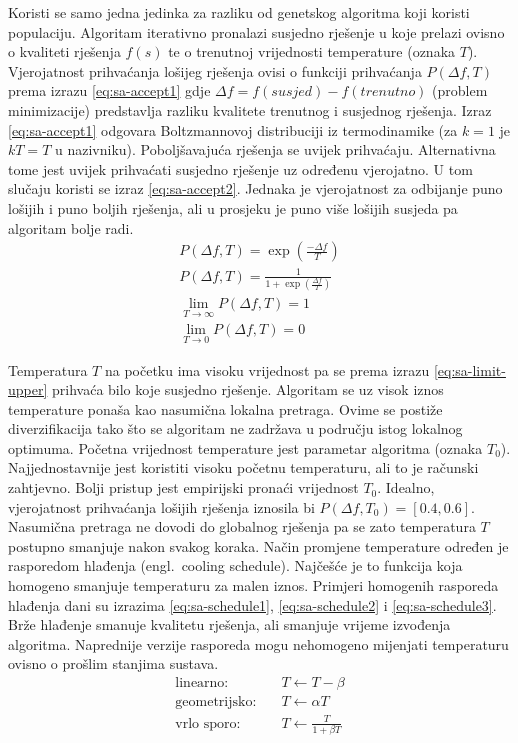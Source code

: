 \documentclass[times, utf8, diplomski]{fer}
\begin{document}
Koristi se samo jedna jedinka za razliku od genetskog algoritma koji koristi populaciju. Algoritam iterativno pronalazi susjedno rješenje u koje prelazi ovisno o kvaliteti rješenja $f(s)$ te o trenutnoj vrijednosti temperature (oznaka $T$). Vjerojatnost prihvaćanja lošijeg rješenja ovisi o funkciji prihvaćanja $P(\Delta f, T)$ prema izrazu \ref{eq:sa-accept1} gdje $\Delta f=f(susjed)-f(trenutno)$ (problem minimizacije) predstavlja razliku kvalitete trenutnog i susjednog rješenja. Izraz \ref{eq:sa-accept1} odgovara Boltzmannovoj distribuciji iz termodinamike (za $k=1$ je $kT=T$ u nazivniku). Poboljšavajuća rješenja se uvijek prihvaćaju. Alternativna tome jest uvijek prihvaćati susjedno rješenje uz određenu vjerojatno. U tom slučaju koristi se izraz \ref{eq:sa-accept2}. Jednaka je vjerojatnost za odbijanje puno lošijih i puno boljih rješenja, ali u prosjeku je puno više lošijih susjeda pa algoritam bolje radi.
%
\begin{gather}
	\label{eq:sa-accept1}
	P(\Delta f, T)=\exp(\frac{- \Delta f}{T}) \\
	\label{eq:sa-accept2}
	P(\Delta f, T)=\frac{1}{1 + \exp(\frac{\Delta f}{T})} \\
	\label{eq:sa-limit-upper}
	\lim_{T \to \infty} P(\Delta f, T)=1 \\
	\label{eq:sa-limit-lower}
	\lim_{T \to 0} P(\Delta f, T)=0
\end{gather}

Temperatura $T$ na početku ima visoku vrijednost pa se prema izrazu \ref{eq:sa-limit-upper} prihvaća bilo koje susjedno rješenje. Algoritam se uz visok iznos temperature ponaša kao nasumična lokalna pretraga. Ovime se postiže diverzifikacija tako što se algoritam ne zadržava u području istog lokalnog optimuma. Početna vrijednost temperature jest parametar algoritma (oznaka $T_{0}$). Najjednostavnije jest koristiti visoku početnu temperaturu, ali to je računski zahtjevno. Bolji pristup jest empirijski pronaći vrijednost $T_{0}$. Idealno, vjerojatnost prihvaćanja lošijih rješenja iznosila bi $P(\Delta f, T_{0})=[0.4, 0.6]$. Nasumična pretraga ne dovodi do globalnog rješenja pa se zato temperatura $T$ postupno smanjuje nakon svakog koraka. Način promjene temperature određen je rasporedom hlađenja (engl.~cooling schedule). Najčešće je to funkcija koja homogeno smanjuje temperaturu za malen iznos. Primjeri homogenih rasporeda hlađenja dani su izrazima \ref{eq:sa-schedule1}, \ref{eq:sa-schedule2} i \ref{eq:sa-schedule3}. Brže hlađenje smanuje kvalitetu rješenja, ali smanjuje vrijeme izvođenja algoritma. Naprednije verzije rasporeda mogu nehomogeno mijenjati temperaturu ovisno o prošlim stanjima sustava.
%
\begin{align}
	\label{eq:sa-schedule1}
	\text{linearno:} \quad & T \leftarrow T - \beta \\
	\label{eq:sa-schedule2}
	\text{geometrijsko:} \quad & T \leftarrow \alpha T \\
	\label{eq:sa-schedule3}
	\text{vrlo sporo:} \quad & T \leftarrow \frac{T}{1 + \beta T}
\end{align}
\end{document}
